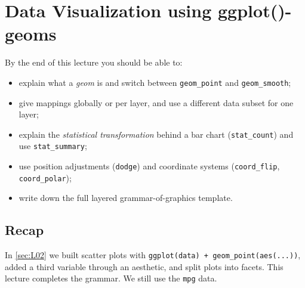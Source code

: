\section{Data Visualization using ggplot()-geoms}\label{sec:L03}


\begin{guiding*}
By the end of this lecture you should be able to:
\begin{itemize}
  \item explain what a \emph{geom} is and switch between \texttt{geom\_point} and \texttt{geom\_smooth};
  \item give mappings globally or per layer, and use a different data subset for one layer;
  \item explain the \emph{statistical transformation} behind a bar chart (\texttt{stat\_count}) and use \texttt{stat\_summary};
  \item use position adjustments (\texttt{dodge}) and coordinate systems (\texttt{coord\_flip}, \texttt{coord\_polar});
  \item write down the full layered grammar-of-graphics template.
\end{itemize}
\end{guiding*}

\subsection{Recap}
In \cref{sec:L02} we built scatter plots with \texttt{ggplot(data) + geom\_point(aes(...))},
added a third variable through an aesthetic, and split plots into facets. This lecture
completes the grammar. We still use the \texttt{mpg} data.

